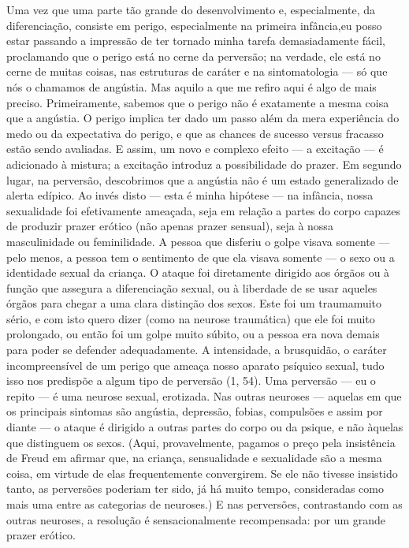 Uma vez que uma parte tão grande do desenvolvimento e,
especialmente, da diferenciação, consiste em perigo, especialmente na
primeira infância,\idxinfanperig[|(] eu posso estar passando a impressão de ter tornado
minha tarefa demasiadamente fácil, proclamando que o perigo está no
cerne da perversão; na verdade, ele está no cerne de muitas coisas, nas
estruturas de caráter e na sintomatologia --- só que nós o chamamos de
angústia.\idxangu{} Mas aquilo a que me refiro aqui é algo de mais preciso.
Primeiramente, sabemos que o perigo não é exatamente a mesma coisa que
a angústia. O perigo implica ter dado um passo além da mera experiência
do medo ou da expectativa do perigo, e que as chances de sucesso
versus fracasso estão sendo avaliadas. E assim, um novo e complexo
efeito --- a excitação --- é adicionado à mistura; a excitação
introduz a possibilidade do prazer. Em segundo lugar, na perversão,
descobrimos que a angústia não é um estado generalizado de alerta
edípico. Ao invés disto --- esta é minha hipótese --- na infância,
nossa sexualidade foi efetivamente ameaçada, seja em relação a partes
do corpo capazes de produzir prazer erótico (não apenas prazer
sensual), seja à nossa masculinidade ou feminilidade. A pessoa que
disferiu o golpe visava somente --- pelo menos, a pessoa tem o
sentimento de que ela visava somente --- o sexo ou a identidade
sexual\idxiden{} da criança. O ataque foi diretamente dirigido aos órgãos ou à
função que assegura a diferenciação sexual, ou à liberdade de se usar
aqueles órgãos para chegar a uma clara distinção dos sexos. Este foi um
trauma\idxtrauma[|(] muito sério, e com isto quero dizer (como na neurose traumática)
que ele foi muito prolongado, ou então foi um golpe muito súbito, ou a
pessoa era nova demais para poder se defender adequadamente. A
intensidade, a brusquidão, o caráter incompreensível de um perigo que
ameaça nosso aparato psíquico sexual, tudo isso nos predispõe a algum
tipo de perversão (1, 54). Uma perversão --- eu o repito --- é uma
neurose\idxpervneuro{} sexual, erotizada. Nas outras neuroses --- aquelas em que os
principais sintomas são angústia, depressão, fobias, compulsões e assim
por diante --- o ataque é dirigido a outras partes do corpo ou da
psique, e não àquelas que distinguem os sexos. (Aqui, provavelmente,
pagamos o preço pela insistência de Freud\idxfreudsexua{} em afirmar que, na criança,
sensualidade e sexualidade\idxsexuateo{} são a mesma coisa, em virtude de elas
frequentemente convergirem. Se ele não tivesse insistido tanto, as
perversões poderiam ter sido, já há muito tempo, consideradas como mais
uma entre as categorias de neuroses.) E nas perversões, contrastando
com as outras neuroses, a resolução é sensacionalmente recompensada:
por um grande prazer erótico.

